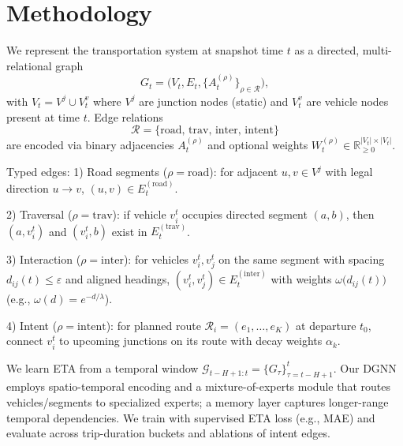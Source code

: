 \section{Methodology}
We represent the transportation system at snapshot time $t$ as a directed, multi-relational graph
$$G_t = \big(V_t, E_t, \{A_t^{(\rho)}\}_{\rho\in\mathcal{R}}\big),$$
with $V_t = V^j \cup V_t^v$ where $V^j$ are junction nodes (static) and $V_t^v$ are vehicle nodes present at time $t$. Edge relations
$$\mathcal{R}=\{\text{road},\,\text{trav},\,\text{inter},\,\text{intent}\}$$
are encoded via binary adjacencies $A_t^{(\rho)}$ and optional weights $W_t^{(\rho)}\in\mathbb{R}_{\ge 0}^{|V_t|\times|V_t|}$.

Typed edges:
1) Road segments ($\rho=\text{road}$): for adjacent $u,v\in V^j$ with legal direction $u\!\to\!v$, $(u,v)\in E_t^{(\text{road})}$.

2) Traversal ($\rho=\text{trav}$): if vehicle $v_i^t$ occupies directed segment $(a,b)$, then $(a, v_i^t)$ and $(v_i^t, b)$ exist in $E_t^{(\text{trav})}$.

3) Interaction ($\rho=\text{inter}$): for vehicles $v_i^t, v_j^t$ on the same segment with spacing $d_{ij}(t)\le \varepsilon$ and aligned headings, $(v_i^t, v_j^t)\in E_t^{(\text{inter})}$ with weights $\omega\big(d_{ij}(t)\big)$ (e.g., $\omega(d)=e^{-d/\lambda}$).

4) Intent ($\rho=\text{intent}$): for planned route $\mathcal{R}_i=(e_1,\ldots,e_K)$ at departure $t_0$, connect $v_i^t$ to upcoming junctions on its route with decay weights $\alpha_k$.

We learn ETA from a temporal window $\mathcal{G}_{t-H+1:t}=\{G_{\tau}\}_{\tau=t-H+1}^{t}$. Our DGNN employs spatio-temporal encoding and a mixture-of-experts module that routes vehicles/segments to specialized experts; a memory layer captures longer-range temporal dependencies. We train with supervised ETA loss (e.g., MAE) and evaluate across trip-duration buckets and ablations of intent edges.
